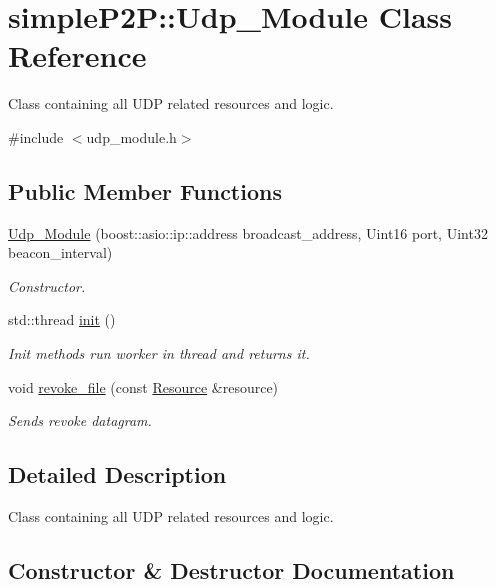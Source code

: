 \hypertarget{classsimpleP2P_1_1Udp__Module}{}\section{simple\+P2P\+:\+:Udp\+\_\+\+Module Class Reference}
\label{classsimpleP2P_1_1Udp__Module}


Class containing all U\+DP related resources and logic.  




{\ttfamily \#include $<$udp\+\_\+module.\+h$>$}

\subsection*{Public Member Functions}
\begin{DoxyCompactItemize}
\item 
\hyperlink{classsimpleP2P_1_1Udp__Module_ae82263553672721e6a6ec034617e08ba}{Udp\+\_\+\+Module} (boost\+::asio\+::ip\+::address broadcast\+\_\+address, Uint16 port, Uint32 beacon\+\_\+interval)
\begin{DoxyCompactList}\small\item\em Constructor. \end{DoxyCompactList}\item 
std\+::thread \hyperlink{classsimpleP2P_1_1Udp__Module_a6e1598a38a557ebdf6eb4849b3cde9db}{init} ()
\begin{DoxyCompactList}\small\item\em Init methods run worker in thread and returns it. \end{DoxyCompactList}\item 
void \hyperlink{classsimpleP2P_1_1Udp__Module_ad3904b2be4e113a8f7be11b23cfde4d2}{revoke\+\_\+file} (const \hyperlink{classsimpleP2P_1_1Resource}{Resource} \&resource)
\begin{DoxyCompactList}\small\item\em Sends revoke datagram. \end{DoxyCompactList}\end{DoxyCompactItemize}


\subsection{Detailed Description}
Class containing all U\+DP related resources and logic. 

\subsection{Constructor \& Destructor Documentation}
\mbox{\label{classsimpleP2P_1_1Udp__Module_ae82263553672721e6a6ec034617e08ba}} 
